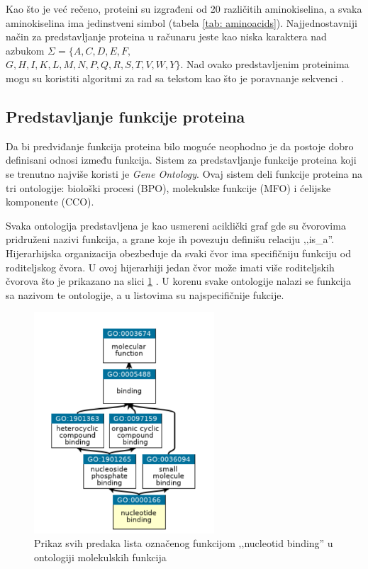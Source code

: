 
Kao što je već rečeno, proteini su izgrađeni od 20 različitih aminokiselina, a svaka aminokiselina ima jedinstveni simbol (tabela \ref{tab: aminoacids}). Najjednostavniji način za predstavljanje proteina u računaru jeste kao niska karaktera nad azbukom $\Sigma = \{A, C, D, E, F,$ \\ $ G, H, I, K, L, M, N, P, Q, R, S, T, V, W, Y\}$. Nad ovako predstavljenim proteinima mogu su koristiti algoritmi za rad sa tekstom kao što je poravnanje sekvenci \cite{radivojac}.


\subsection{Predstavljanje funkcije proteina}

Da bi predviđanje funkcija proteina bilo moguće neophodno je da postoje dobro definisani odnosi između funkcija. Sistem za predstavljanje funkcije proteina koji se trenutno najviše koristi je \textit{Gene Ontology}. Ovaj sistem deli funkcije proteina na tri ontologije: biološki procesi (BPO), molekulske funkcije (MFO) i ćelijske komponente (CCO). 


Svaka ontologija predstavljena je kao usmereni aciklički graf gde su čvorovima pridruženi nazivi funkcija, a grane koje ih povezuju definišu relaciju ‚‚is\_a''. Hijerarhijska organizacija obezbeđuje da svaki čvor ima specifičniju funkciju od roditeljskog čvora. U ovoj hijerarhiji jedan čvor može imati više roditeljskih čvorova što je prikazano na slici \ref{fig:subgraph} \cite{doktJK, GO}. U korenu svake ontologije nalazi se funkcija sa nazivom te ontologije, a u listovima su najspecifičnije fukcije.


\begin{figure}[h]
	\centering
	\includegraphics[width=0.6\textwidth]{Figures/go_subgraph.png}
	\caption{Prikaz svih predaka lista označenog funkcijom ‚‚nucleotid binding'' u ontologiji molekulskih funkcija \cite{quickGO}}
	\label{fig:subgraph}
\end{figure}


